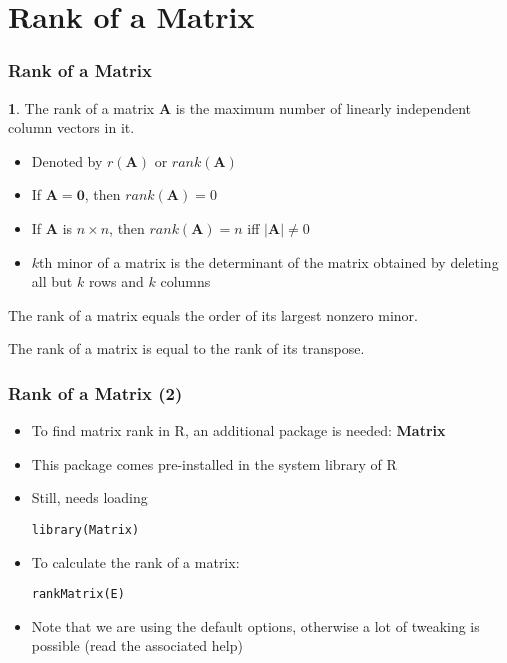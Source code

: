 \documentclass[10pt]{beamer}
\theoremstyle{definition}
\newtheorem{definition}{\translate{Definition}}
\begin{document}
\section{Rank of a Matrix}
\begin{frame}[fragile]
\frametitle{Rank of a Matrix}
\begin{definition}
	The rank of a matrix $\mathbf{A}$ is the maximum number of linearly independent column vectors in it.
\end{definition}
\begin{itemize}
	\item Denoted by $r(\mathbf{A})$ or $rank(\mathbf{A})$
	\item If $\mathbf{A} = \mathbf{0}$, then $rank(\mathbf{A}) = 0$
	\item If $\mathbf{A}$ is $n\times n$, then $rank(\mathbf{A}) = n$ iff $|\mathbf{A}| \neq 0$
	\item $k$th minor of a matrix is the determinant of the matrix obtained by deleting all but $k$ rows and $k$ columns
\end{itemize}
\begin{theorem}
	The rank of a matrix equals the order of its largest nonzero minor.
\end{theorem}
\begin{theorem}
	The rank of a matrix is equal to the rank of its transpose.
\end{theorem}
\end{frame}

\begin{frame}[fragile]
\frametitle{Rank of a Matrix (2)}
\begin{itemize}
	\item To find matrix rank in R, an additional package is needed: \textbf{Matrix}
	\item This package comes pre-installed in the system library of R
	\item Still, needs loading
	\begin{lstlisting}[style = rstyle, breaklines]
	library(Matrix)	
	\end{lstlisting}
	\item To calculate the rank of a matrix:
	\begin{lstlisting}[style = rstyle, breaklines]
	rankMatrix(E)	
	\end{lstlisting}
	\item Note that we are using the default options, otherwise a lot of tweaking is possible (read the associated help)
\end{itemize}
\end{frame}
\end{document}

